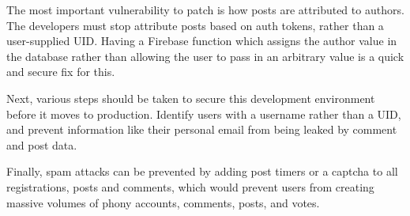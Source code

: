 The most important vulnerability to patch is how posts are attributed to authors. The developers must stop attribute posts based on auth tokens, rather than a user-supplied UID. Having a Firebase function which assigns the author value in the database rather than allowing the user to pass in an arbitrary value is a quick and secure fix for this.

Next, various steps should be taken to secure this development environment before it moves to production. Identify users with a username rather than a UID, and prevent information like their personal email from being leaked by comment and post data.

Finally, spam attacks can be prevented by adding post timers or a captcha to all registrations, posts and comments, which would prevent users from creating massive volumes of phony accounts, comments, posts, and votes.